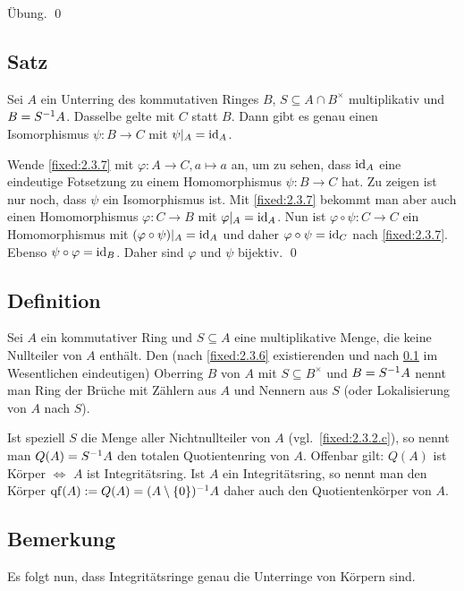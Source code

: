 \proof Übung. \qed

\subsection{Satz} \label{fixed:2.3.8} Sei $A$ ein Unterring des kommutativen Ringes $B$, $S \subseteq A \cap B^\times$ multiplikativ und $B = S^{-1} A$. Dasselbe gelte mit $C$ statt $B$. Dann gibt es genau einen Isomorphismus $\psi: B \to C$ mit $\psi|_A = \operatorname{id}_A$.

\proof Wende \ref{fixed:2.3.7} mit $\varphi: A \to C, a \mapsto a$ an, um zu sehen, dass $\operatorname{id}_A$ eine eindeutige Fotsetzung zu einem Homomorphismus $\psi : B \to C$ hat. Zu zeigen ist nur noch, dass $\psi$ ein Isomorphismus ist. Mit \ref{fixed:2.3.7} bekommt man aber auch einen Homomorphismus $\varphi: C \to B$ mit $\varphi|_A = \operatorname{id}_A$. Nun ist $\varphi \circ \psi: C \to C$ ein Homomorphismus mit $(\varphi \circ \psi)|_A = \operatorname{id}_A$ und daher $\varphi \circ \psi = \operatorname{id}_C$ nach \ref{fixed:2.3.7}. Ebenso $\psi \circ \varphi = \operatorname{id}_B$. Daher sind $\varphi$ und $\psi$ bijektiv. \qed

\subsection{Definition} \label{fixed:2.3.9} Sei $A$ ein kommutativer Ring und $S \subseteq A$ eine multiplikative Menge, die keine Nullteiler von $A$ enthält. Den (nach \ref{fixed:2.3.6} existierenden und nach \ref{fixed:2.3.8} im Wesentlichen eindeutigen) Oberring $B$ von $A$ mit $S \subseteq B^\times$ und $B = S^{-1} A$ nennt man Ring der Brüche mit Zählern aus $A$ und Nennern aus $S$ (oder Lokalisierung von $A$ nach $S$).

Ist speziell $S$ die Menge aller Nichtnullteiler von $A$ (vgl.~\ref{fixed:2.3.2.c}), so nennt man $Q(A) = S^{-1} A$ den totalen Quotientenring von $A$. Offenbar gilt: $Q(A)$ ist Körper $\iff$ $A$ ist Integritätsring. Ist $A$ ein Integritätsring, so nennt man den Körper $\operatorname{qf}(A) := Q(A) = (A\setminus\{0\})^{-1} A$ daher auch den Quotientenkörper von $A$.

\subsection{Bemerkung} Es folgt nun, dass Integritätsringe genau die Unterringe von Körpern sind.

